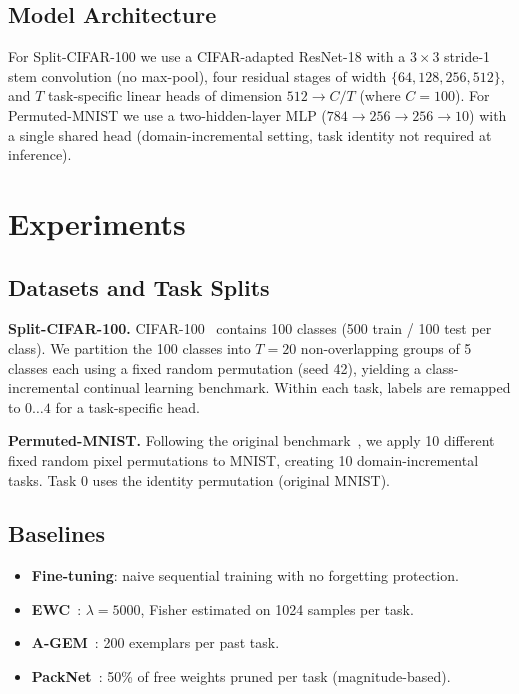 \documentclass[conference]{IEEEtran}
\begin{document}
\subsection{Model Architecture}

For Split-CIFAR-100 we use a CIFAR-adapted ResNet-18 with a $3\times 3$ stride-1
stem convolution (no max-pool), four residual stages of width $\{64,128,256,512\}$,
and $T$ task-specific linear heads of dimension $512 \to C/T$ (where $C=100$).
For Permuted-MNIST we use a two-hidden-layer MLP ($784 \to 256 \to 256 \to 10$)
with a single shared head (domain-incremental setting, task identity not required
at inference).

\section{Experiments}
\label{sec:experiments}

\subsection{Datasets and Task Splits}

\textbf{Split-CIFAR-100.}
CIFAR-100~\cite{krizhevsky2009learning} contains 100 classes (500 train / 100 test per class).
We partition the 100 classes into $T=20$ non-overlapping groups of 5 classes each using
a fixed random permutation (seed 42), yielding a class-incremental continual learning
benchmark.  Within each task, labels are remapped to $0\ldots4$ for a task-specific head.

\textbf{Permuted-MNIST.}
Following the original benchmark~\cite{kirkpatrick2017overcoming}, we apply 10 different
fixed random pixel permutations to MNIST, creating 10 domain-incremental tasks.
Task 0 uses the identity permutation (original MNIST).

\subsection{Baselines}

\begin{itemize}
    \item \textbf{Fine-tuning}: naive sequential training with no forgetting protection.
    \item \textbf{EWC}~\cite{kirkpatrick2017overcoming}: $\lambda=5000$, Fisher estimated
          on 1024 samples per task.
    \item \textbf{A-GEM}~\cite{chaudhry2019efficient}: 200 exemplars per past task.
    \item \textbf{PackNet}~\cite{mallya2018packnet}: 50\% of free weights pruned per task
          (magnitude-based).
\end{itemize}
\end{document}
